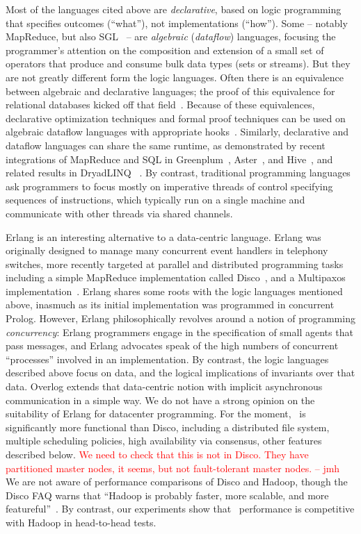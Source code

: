 \documentclass{sig-alternate}
\newcommand{\jmh}[1]{{\textcolor{red}{#1 -- jmh}}}
\begin{document}
Most of the languages cited above are {\em declarative}, based on logic programming that specifies outcomes (``what''), not implementations (``how'').  Some -- notably MapReduce, but also SGL~\cite{cornellgames} -- are {\em algebraic} ({\em dataflow}) languages, focusing the programmer's attention on the composition and extension of a small set of operators that produce and consume bulk data types (sets or streams).  But they are not greatly different form the logic languages. Often there is an equivalence between algebraic and declarative languages; the proof of this equivalence for relational databases kicked off that field~\cite{Codd70}. Because of these equivalences, declarative optimization techniques and formal proof techniques can be used on algebraic dataflow languages with appropriate hooks~\cite{volcano,cornellgames}. Similarly, declarative and dataflow languages can share the same runtime, as demonstrated by recent integrations of MapReduce and SQL in Greenplum~\cite{greenplum}, Aster~\cite{aster}, and Hive~\cite{hive}, and related results in DryadLINQ~\cite{DryadLINQ} .  By contrast, traditional programming languages ask programmers to focus mostly on imperative threads of control specifying sequences of instructions, which typically run on a single machine and communicate with other threads via shared channels.

Erlang is an interesting alternative to a data-centric language.  Erlang was originally designed to manage many concurrent event handlers in telephony switches, more recently targeted at parallel and distributed programming tasks including a simple MapReduce implementation called Disco~\cite{disco}, and a Multipaxos implementation~\cite{erlangpaxos}.  Erlang shares some roots with  the logic languages mentioned above, inasmuch as its initial implementation was programmed in concurrent Prolog.  However, Erlang philosophically revolves around a notion of programming {\em concurrency}: Erlang programmers engage in the specification of small agents that pass messages, and Erlang advocates speak of the high numbers of concurrent ``processes'' involved in an implementation.  By contrast, the logic languages described above focus on data, and the logical implications of invariants over that data.  Overlog extends that data-centric notion with implicit asynchronous communication in a simple way.  We do not have a strong opinion on the suitability of Erlang for datacenter programming.  For the moment, \BOOM\ is significantly more functional than Disco, including a distributed file system, multiple scheduling policies, high availability via consensus, other features described below. \jmh{We need to check that this is not in Disco.  They have partitioned master nodes, it seems, but not fault-tolerant master nodes.}   We are not aware of performance comparisons of Disco and Hadoop, though the Disco FAQ warns that ``Hadoop is probably faster, more scalable, and more featureful''~\cite{disco}.  By contrast, our experiments show that \BOOM\ performance is competitive with Hadoop in head-to-head tests.
\end{document}
